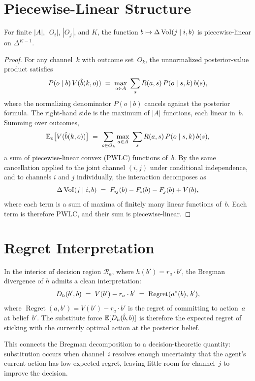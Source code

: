 \appendix

\section{Piecewise-Linear Structure}
\label{app:polyhedral}

\begin{theoremA}
\label{prop:polyhedral}
For finite $|A|$, $|O_i|$, $|O_j|$, and $K$, the function $b \mapsto \Delta\operatorname{VoI}(j \mid i, b)$ is piecewise-linear on $\Delta^{K-1}$.
\end{theoremA}

\begin{proof}
For any channel~$k$ with outcome set~$O_k$, the unnormalized posterior-value product satisfies
\[
  P(o \mid b)\, V(\hat{b}(k, o))
  \;=\; \max_{a \in A}\; \sum_s R(a,s)\, P(o \mid s, k)\, b(s),
\]
where the normalizing denominator $P(o \mid b)$ cancels against the posterior formula.
The right-hand side is the maximum of $|A|$ functions, each linear in~$b$.
Summing over outcomes,
\[
  \mathbb{E}_o\bigl[V(\hat{b}(k, o))\bigr]
  \;=\;
  \sum_{o \in O_k} \max_{a \in A}\; \sum_s R(a,s)\, P(o \mid s, k)\, b(s),
\]
a sum of piecewise-linear convex (PWLC) functions of~$b$.
By the same cancellation applied to the joint channel $(i,j)$ under conditional independence, and to channels $i$ and $j$ individually, the interaction decomposes as
\[
  \Delta\operatorname{VoI}(j \mid i, b)
  \;=\; F_{ij}(b) - F_i(b) - F_j(b) + V(b),
\]
where each term is a sum of maxima of finitely many linear functions of~$b$.
Each term is therefore PWLC, and their sum is piecewise-linear.
\end{proof}

\section{Regret Interpretation}
\label{app:regret}

In the interior of decision region $\mathcal{R}_a$, where $h(b') = r_a \cdot b'$, the Bregman divergence of $h$ admits a clean interpretation:
\[
  D_h(b', b)
  \;=\; V(b') - r_a \cdot b'
  \;=\; \operatorname{Regret}(a^*(b),\, b'),
\]
where $\operatorname{Regret}(a, b') = V(b') - r_a \cdot b'$ is the regret of committing to action~$a$ at belief~$b'$.
The substitute force $\mathbb{E}[D_h(\hat{b}, b)]$ is therefore the expected regret of sticking with the currently optimal action at the posterior belief.

This connects the Bregman decomposition to a decision-theoretic quantity: substitution occurs when channel~$i$ resolves enough uncertainty that the agent's current action has low expected regret, leaving little room for channel~$j$ to improve the decision.


